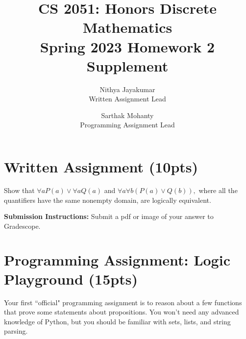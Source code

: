 \documentclass{article}
\title{\vspace{-1cm}CS 2051: Honors Discrete Mathematics \\Spring 2023 Homework 2 Supplement}
\author{Nithya Jayakumar \\ \small{Written Assignment Lead}
\and Sarthak Mohanty \\ \small{Programming Assignment Lead}}
\date{}
\begin{document}
\maketitle


\section*{Written Assignment (10pts)}
    Show that $\forall a P(a) \lor \forall a Q(a)$ and $\forall a \forall b (P(a) \lor Q(b)),$ where all the quantifiers have the same nonempty domain, are logically equivalent.

    \vspace{3mm}
    \textbf{Submission Instructions:} 
    Submit a pdf or image of your answer to Gradescope.


\section*{Programming Assignment: Logic Playground (15pts)}

    Your first ``official" programming assignment is to reason about a few functions that prove some statements about propositions. You won't need any advanced knowledge of Python, but you should be familiar with sets, lists, and string parsing.
\end{document}
